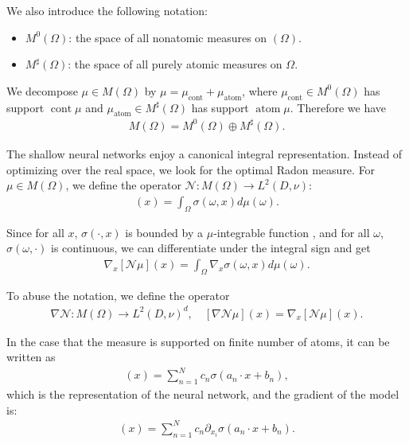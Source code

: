 \documentclass[12pt,fleqn]{amsart}
\theoremstyle{definition}
\DeclareMathOperator*{\atom}{atom}
\DeclareMathOperator*{\cont}{cont}
\begin{document}
We also introduce the following notation:
\begin{itemize}
	\item $M^0(\Omega)$: the space of all nonatomic measures on $(\Omega)$. 
	\item $M^\sharp(\Omega)$: the space of all purely atomic measures on $\Omega$. 
\end{itemize}

We decompose $\mu \in M(\Omega)$ by $\mu = \mu_{\cont} + \mu_{\atom}$, where $\mu_{\cont} \in M^0(\Omega)$ has support $\cont \mu$ and $\mu_{\atom} \in M^\sharp(\Omega)$ has support $\atom \mu$. Therefore we have
\begin{align*}
	M(\Omega) = M^0(\Omega) \oplus M^\sharp(\Omega). 
\end{align*}

The shallow neural networks enjoy a canonical integral representation. 
Instead of optimizing over the real space, we look for the optimal Radon measure. 
For $\mu \in M(\Omega)$, we define the operator $\mathcal{N}: M(\Omega) \rightarrow L^2(D, \nu) $: 
\begin{align*}
	[\mathcal{N}\mu] (x) = \int_\Omega \sigma (\omega , x) d\mu(\omega).
\end{align*}

Since for all $x$, $\sigma(\cdot, x)$ is bounded by a $\mu$-integrable function , and for all $\omega$, $\sigma(\omega, \cdot )$ is continuous, we can differentiate under the integral sign and get
\begin{align*}
	\nabla_x [\mathcal{N}\mu](x) = \int_\Omega \nabla_x \sigma(\omega,  x) d\mu(\omega). 
\end{align*}

To abuse the notation, we define the operator
\begin{align*}
	\nabla \mathcal{N}: M(\Omega) \rightarrow L^2(D, \nu)^d, \quad [\nabla\mathcal{N} \mu](x) = \nabla_x[\mathcal{N} \mu](x). 
\end{align*}

In the case that the measure is supported on finite number of atoms, it can be written as
\begin{align*}
	[\mathcal{N}\mu](x) = \sum_{ n = 1}^N c_n \sigma(a_n \cdot x + b_n),
\end{align*}
which is the representation of the neural network, and the gradient of the model is:
\begin{align*}
	[\partial_{x_i} \mathcal{N}](x) = \sum_{n = 1}^N c_n \partial_{x_i} \sigma(a_n \cdot x + b_n).
\end{align*}
\end{document}
